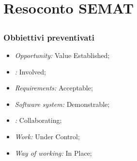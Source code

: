 \section{Resoconto SEMAT}\label{resocontoSEMAT}
\subsection{\fPAt}\label{resocontoSEMAT1}
\subsubsection{Obbiettivi preventivati}
\begin{itemize}
\item \textit{Opportunity:} Value Established;
\item \textit{:} Involved;
\item \textit{Requirements:} Acceptable;
\item \textit{Software system:} Demonstrable;
\item \textit{:} Collaborating;
\item \textit{Work:} Under Control;
\item \textit{Way of working:} In Place;
\end{itemize}
